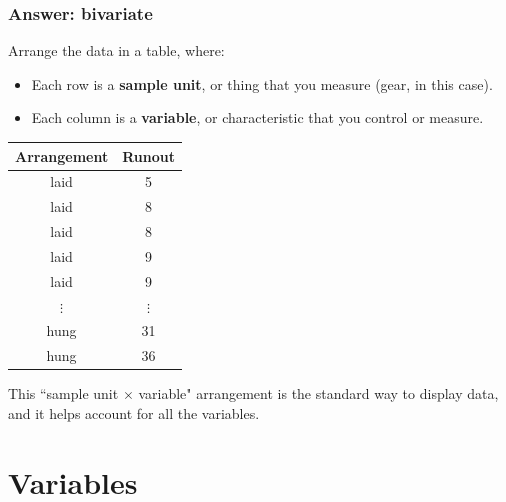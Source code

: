 \documentclass[handout]{beamer}\usepackage{graphicx, color}
\numberwithin{equation}{section}
\begin{document}
\begin{frame}[fragile]
\frametitle{Answer: bivariate}



 \small
Arrange the data in a table, where:
\begin{itemize}
\item Each row is a {\bf sample unit}, or thing that you measure (gear, in this case).
\pause \item Each column is a {\bf variable}, or characteristic that you control or measure.
\end{itemize}

\pause \begin{center}
\begin{tabular}{cc}
Arrangement & Runout \\ \hline
laid & 5 \\
laid & 8 \\ 
laid & 8 \\ 
laid & 9 \\
laid & 9 \\ 
$\vdots$ & $\vdots$ \\ 
hung & 31 \\ 
hung & 36 \\
\end{tabular}
\end{center} 

This ``sample unit $\times$ variable" arrangement is the standard way to display data, and it helps account for all the variables.

\end{frame}

\section{Variables}
\end{document}
